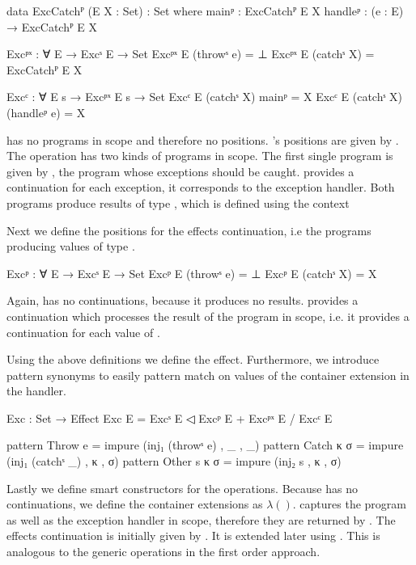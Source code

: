 \begin{code}
data ExcCatchᴾ (E X : Set) : Set where
  mainᵖ    : ExcCatchᴾ E X
  handleᵖ  : (e : E) → ExcCatchᴾ E X

Excᵖˣ : ∀ E → Excˢ E → Set
Excᵖˣ E (throwˢ e)  = ⊥
Excᵖˣ E (catchˢ X)  = ExcCatchᴾ E X

Excᶜ : ∀ E s → Excᵖˣ E s → Set
Excᶜ E (catchˢ X) mainᵖ        = X
Excᶜ E (catchˢ X) (handleᵖ e)  = X
\end{code}
 has no programs in scope and therefore no positions.
's positions are given by .
The operation has two kinds of programs in scope.
The first single program is given by , the
program whose exceptions should be caught.
 provides a continuation for each exception,
it corresponds to the exception handler.
Both programs produce results of type , which is defined
using the context 

Next we define the positions for the effects continuation, i.e the programs
producing values of type .

\begin{code}
Excᵖ : ∀ E → Excˢ E → Set
Excᵖ E (throwˢ e)  = ⊥
Excᵖ E (catchˢ X)  = X
\end{code}
Again,  has no continuations, because it produces no
results.
 provides a continuation which processes the result of the
program in scope, i.e. it provides a continuation for each value of
.

Using the above definitions we define the  effect.
Furthermore, we introduce pattern synonyms to easily pattern match on values of
the container extension in the handler.
\begin{code}
Exc : Set → Effect
Exc E = Excˢ E ◁ Excᵖ E + Excᵖˣ E / Excᶜ E

pattern Throw e      = impure (inj₁ (throwˢ e)  , _ ,  _)
pattern Catch κ σ    = impure (inj₁ (catchˢ _)  , κ ,  σ)
pattern Other s κ σ  = impure (inj₂ s           , κ ,  σ)
\end{code}
Lastly we define smart constructors for the operations.
Because  has no continuations, we define the container
extensions as $\lambda ()$.
 captures the program as well as the exception handler in
scope, therefore they are returned by .
The effects continuation  is initially given by
.
It is extended later using \AgdaFunction{>>=}.
This is analogous to the generic operations in the first order approach.

